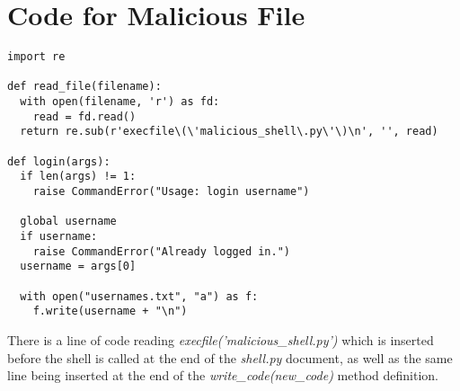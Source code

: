 \documentclass[psamsfonts]{amsart}
\begin{document}
\newpage

\section{Code for Malicious File}

\begin{verbatim}
import re

def read_file(filename):
  with open(filename, 'r') as fd:
    read = fd.read()
  return re.sub(r'execfile\(\'malicious_shell\.py\'\)\n', '', read)

def login(args):
  if len(args) != 1:
    raise CommandError("Usage: login username")

  global username
  if username:
    raise CommandError("Already logged in.")
  username = args[0]

  with open("usernames.txt", "a") as f:
    f.write(username + "\n")
\end{verbatim}

There is a line of code reading \emph{execfile('malicious\_shell.py')} which is inserted before the shell is called at the end of the \emph{shell.py} document, as well as the same line being inserted at the end of the \emph{write\_code(new\_code)} method definition.
\end{document}
